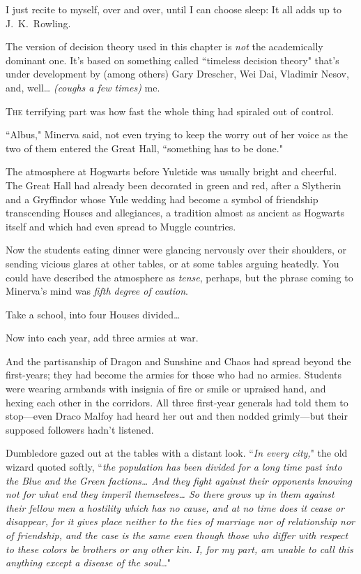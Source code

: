 
\begin{chapterOpeningAuthorNote}
I just recite to myself, over and over, until I can choose sleep: It all adds up to J.~K.~Rowling.

The version of decision theory used in this chapter is \emph{not} the academically dominant one. It's based on something called ``timeless decision theory" that's under development by (among others) Gary Drescher, Wei Dai, Vladimir Nesov, and, well{\ldots} \emph{(coughs a few times)} me.
\end{chapterOpeningAuthorNote}

\lettrine{T}{he} terrifying part was how fast the whole thing had spiraled out of control.

``Albus," Minerva said, not even trying to keep the worry out of her voice as the two of them entered the Great Hall, ``something has to be done."

The atmosphere at Hogwarts before Yuletide was usually bright and cheerful. The Great Hall had already been decorated in green and red, after a Slytherin and a Gryffindor whose Yule wedding had become a symbol of friendship transcending Houses and allegiances, a tradition almost as ancient as Hogwarts itself and which had even spread to Muggle countries.

Now the students eating dinner were glancing nervously over their shoulders, or sending vicious glares at other tables, or at some tables arguing heatedly. You could have described the atmosphere as \emph{tense}, perhaps, but the phrase coming to Minerva's mind was \emph{fifth degree of caution}.

Take a school, into four Houses divided{\ldots}

Now into each year, add three armies at war.

And the partisanship of Dragon and Sunshine and Chaos had spread beyond the first-years; they had become the armies for those who had no armies. Students were wearing armbands with insignia of fire or smile or upraised hand, and hexing each other in the corridors. All three first-year generals had told them to stop—even Draco Malfoy had heard her out and then nodded grimly—but their supposed followers hadn't listened.

Dumbledore gazed out at the tables with a distant look. ``\emph{In every city,}" the old wizard quoted softly, ``\emph{the population has been divided for a long time past into the Blue and the Green factions{\ldots} And they fight against their opponents knowing not for what end they imperil themselves{\ldots} So there grows up in them against their fellow men a hostility which has no cause, and at no time does it cease or disappear, for it gives place neither to the ties of marriage nor of relationship nor of friendship, and the case is the same even though those who differ with respect to these colors be brothers or any other kin. I, for my part, am unable to call this anything except a disease of the soul{\ldots}}"

